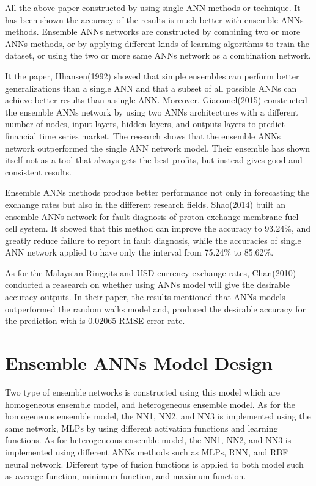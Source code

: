 \documentclass[journal]{IEEEtran}
\begin{document}
All the above paper  constructed by using single ANN methods or technique. It has been shown the accuracy of the results is much better with  ensemble ANNs methods. Ensemble ANNs networks are constructed by combining two or more ANNs methods, or by applying different kinds of learning algorithms to train the dataset, or using the two or more same  ANNs network as a combination network.

It the paper, Hhansen(1992)  showed that simple ensembles can perform better generalizations than a single ANN and that a subset of all possible ANNs can achieve better results than a single ANN. Moreover, Giacomel(2015) constructed the ensemble ANNs network by using two ANNs  architectures  with a different number of nodes, input layers, hidden layers, and outputs layers to predict financial time series market. The research shows that the ensemble ANNs  network outperformed the single ANN network model. Their ensemble has shown itself not as a tool that always gets the best profits, but instead gives good and consistent results.

Ensemble ANNs methods produce  better performance not only in forecasting the exchange rates but also in the different research fields. Shao(2014) built an ensemble ANNs network for fault diagnosis of proton exchange membrane fuel cell system. It showed that this method can improve the accuracy to 93.24\%, and greatly reduce failure  to report in fault diagnosis, while the accuracies of single  ANN network applied to  have  only the interval from 75.24\% to 85.62\%.

As for the Malaysian Ringgits and USD currency exchange rates, Chan(2010) conducted a reasearch on whether using ANNs model will give the desirable accuracy outputs. In their paper, the results mentioned that ANNs models outperformed the random walks model and, produced the desirable accuracy for the prediction with is 0.02065 RMSE error rate.

\section{Ensemble ANNs Model Design}

Two type of ensemble networks is constructed using this model which are homogeneous ensemble model, and  heterogeneous ensemble model. As for the homogeneous ensemble model, the NN1, NN2, and NN3 is implemented using the same network, MLPs by using different activation functions and learning functions. As for heterogeneous ensemble model, the NN1, NN2, and NN3 is implemented using different ANNs methods such as MLPs, RNN, and RBF neural network. Different type of fusion functions is applied to both model such as average function, minimum function, and maximum function.
\end{document}
